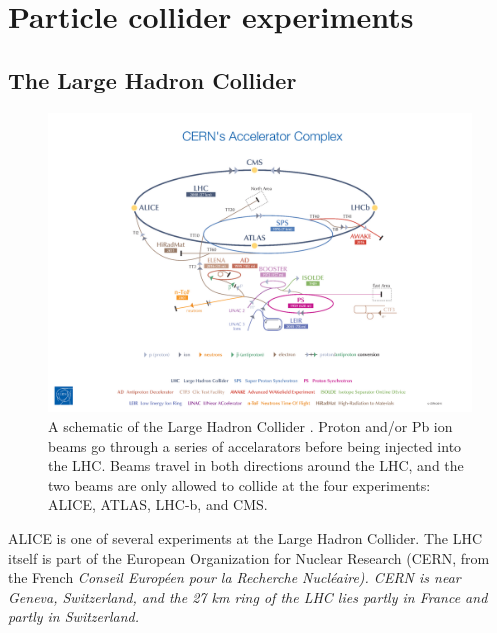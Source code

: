 \section{Particle collider experiments}

\subsection{The Large Hadron Collider}
\label{sec:TheLHC}

\begin{figure}[hbt]
\includegraphics[width=36pc]{Figures/BorrowedFigures/CERNComplex.png}
\caption[Schematic of the LHC]{A schematic of the Large Hadron Collider \cite{EspaceCERN}. 
Proton and/or Pb ion beams go through a series of accelarators before being injected into the LHC. Beams travel in both directions around the LHC, and the two beams are only allowed to collide at the four experiments: ALICE, ATLAS, LHC-b, and CMS.}
\label{fig:CERNComplex}
\end{figure}

ALICE is one of several experiments at the Large Hadron Collider.
The LHC itself is part of the European Organization  for Nuclear Research (CERN, from the French \it Conseil Europ\'een pour la Recherche Nucl\'eaire\rm).
CERN is near Geneva, Switzerland, and the 27 km ring of the LHC lies partly in France and partly in Switzerland.

